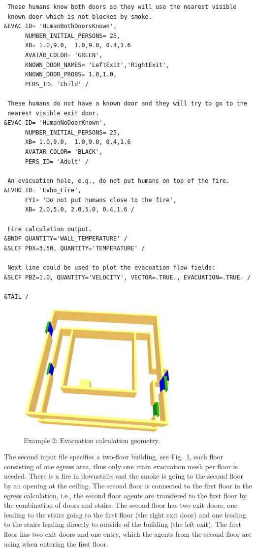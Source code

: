 \documentclass[12pt,a4paper,final,twoside]{stylevk}
\begin{document}
{\begin{verbatim}
 These humans know both doors so they will use the nearest visible
 known door which is not blocked by smoke.
&EVAC ID= 'HumanBothDoorsKnown', 
      NUMBER_INITIAL_PERSONS= 25,
      XB= 1.0,9.0,  1.0,9.0, 0.4,1.6
      AVATAR_COLOR= 'GREEN',
      KNOWN_DOOR_NAMES= 'LeftExit','RightExit',
      KNOWN_DOOR_PROBS= 1.0,1.0,
      PERS_ID= 'Child' / 

 These humans do not have a known door and they will try to go to the
 nearest visible exit door. 
&EVAC ID= 'HumanNoDoorKnown', 
      NUMBER_INITIAL_PERSONS= 25,
      XB= 1.0,9.0,  1.0,9.0, 0.4,1.6
      AVATAR_COLOR= 'BLACK',
      PERS_ID= 'Adult' / 

 An evacuation hole, e.g., do not put humans on top of the fire.
&EVHO ID= 'Evho_Fire',
      FYI= 'Do not put humans close to the fire',
      XB= 2.0,5.0, 2.0,5.0, 0.4,1.6 /

 Fire calculation output.
&BNDF QUANTITY='WALL_TEMPERATURE' / 
&SLCF PBX=3.50, QUANTITY='TEMPERATURE' /

 Next line could be used to plot the evacuation flow fields:
&SLCF PBZ=1.0, QUANTITY='VELOCITY', VECTOR=.TRUE., EVACUATION=.TRUE. / 

&TAIL /

\end{verbatim}
}


\begin{figure}[!tb]
  \centerline{\includegraphics[clip=true,
    width=80mm]{FIGURES/evac_example2_EvacGeom}}
  \caption{Example 2: Evacuation calculation
    geometry.}\label{Fig_Ex2EvacGeom}
\end{figure}

The second input file specifies a two-floor building, see
Fig.~\ref{Fig_Ex2EvacGeom}, each floor consisting of one egress area,
thus only one main evacuation mesh per floor is needed.  There is a
fire in downstairs and the smoke is going to the second floor by an
opening at the ceiling.  The second floor is connected to the first
floor in the egress calculation, i.e., the second floor agents
are transfered to the first floor by the combination of doors and
stairs.  The second floor has two exit doors, one leading to the
stairs going to the first floor (the right exit door) and one leading
to the stairs leading directly to outside of the building (the left
exit).  The first floor has two exit doors and one entry, which the
agents from the second floor are using when entering the first floor.
\end{document}
